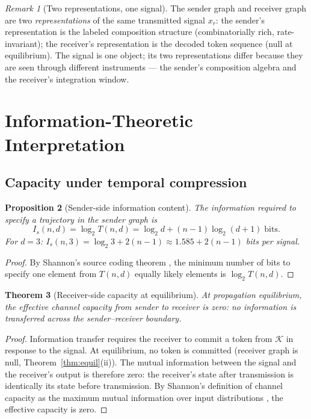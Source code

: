 \documentclass[twocolumn,11pt,a4paper]{article}
\theoremstyle{main}
\newtheorem{theorem}{Theorem}[section]
\newtheorem{proposition}[theorem]{Proposition}
\theoremstyle{definition}
\theoremstyle{remark}
\newtheorem{remark}[theorem]{Remark}
\newcommand{\Know}{\mathcal{K}}
\newcommand{\Traj}{T}
\newcommand{\rate}{r}
\begin{document}
\begin{remark}[Two representations, one signal]
The sender graph and receiver graph are two \emph{representations} of the
same transmitted signal $x_\rate$: the sender's representation is the
labeled composition structure (combinatorially rich, rate-invariant);
the receiver's representation is the decoded token sequence (null at
equilibrium). The signal is one object; its two representations differ
because they are seen through different instruments --- the sender's
composition algebra and the receiver's integration window.
\end{remark}

\section{Information-Theoretic Interpretation}
\label{sec:information}

\subsection{Capacity under temporal compression}

\begin{proposition}[Sender-side information content]
\label{prop:info}
The information required to specify a trajectory in the sender graph is
\[
  I_s(n,d) = \log_2 \Traj(n,d) = \log_2 d + (n-1)\log_2(d+1) \;\text{bits}.
\]
For $d = 3$: $I_s(n,3) = \log_2 3 + 2(n-1) \approx 1.585 + 2(n-1)$
bits per signal.
\end{proposition}

\begin{proof}
By Shannon's source coding theorem \citep{shannon1948}, the minimum
number of bits to specify one element from $\Traj(n,d)$ equally likely
elements is $\log_2 \Traj(n,d)$.
\end{proof}

\begin{theorem}[Receiver-side capacity at equilibrium]
\label{thm:capacity}
At propagation equilibrium, the effective channel capacity from sender to
receiver is zero: no information is transferred across the
sender--receiver boundary.
\end{theorem}

\begin{proof}
Information transfer requires the receiver to commit a token from $\Know$
in response to the signal. At equilibrium, no token is committed
(receiver graph is null, Theorem~\ref{thm:equil}(ii)). The mutual
information between the signal and the receiver's output is therefore
zero: the receiver's state after transmission is identically its state
before transmission. By Shannon's definition of channel capacity as the
maximum mutual information over input distributions \citep{shannon1948},
the effective capacity is zero.
\end{proof}
\end{document}
